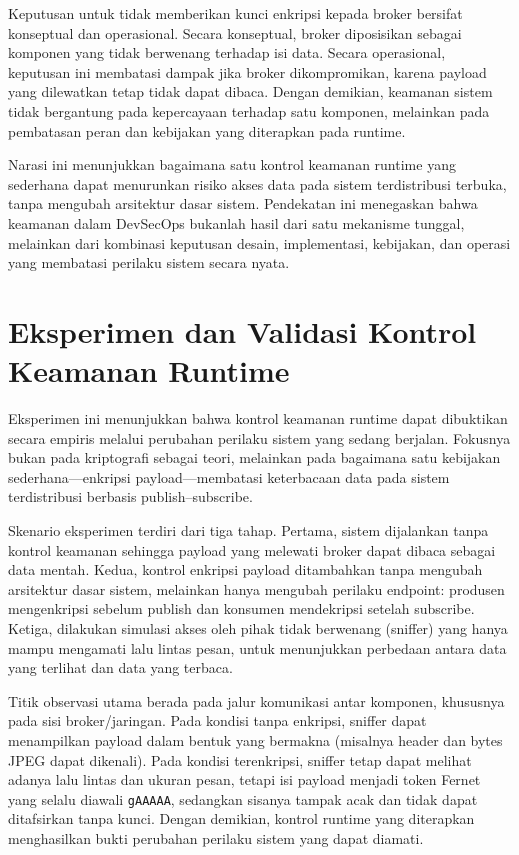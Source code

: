 Keputusan untuk tidak memberikan kunci enkripsi kepada broker bersifat konseptual dan operasional. Secara konseptual, broker diposisikan sebagai komponen yang tidak berwenang terhadap isi data. Secara operasional, keputusan ini membatasi dampak jika broker dikompromikan, karena payload yang dilewatkan tetap tidak dapat dibaca. Dengan demikian, keamanan sistem tidak bergantung pada kepercayaan terhadap satu komponen, melainkan pada pembatasan peran dan kebijakan yang diterapkan pada runtime.

Narasi ini menunjukkan bagaimana satu kontrol keamanan runtime yang sederhana dapat menurunkan risiko akses data pada sistem terdistribusi terbuka, tanpa mengubah arsitektur dasar sistem. Pendekatan ini menegaskan bahwa keamanan dalam DevSecOps bukanlah hasil dari satu mekanisme tunggal, melainkan dari kombinasi keputusan desain, implementasi, kebijakan, dan operasi yang membatasi perilaku sistem secara nyata.


\section{Eksperimen dan Validasi Kontrol Keamanan Runtime}

Eksperimen ini menunjukkan bahwa kontrol keamanan runtime dapat dibuktikan secara empiris melalui perubahan perilaku sistem yang sedang berjalan. Fokusnya bukan pada kriptografi sebagai teori, melainkan pada bagaimana satu kebijakan sederhana---enkripsi payload---membatasi keterbacaan data pada sistem terdistribusi berbasis publish--subscribe.

Skenario eksperimen terdiri dari tiga tahap. Pertama, sistem dijalankan tanpa kontrol keamanan sehingga payload yang melewati broker dapat dibaca sebagai data mentah. Kedua, kontrol enkripsi payload ditambahkan tanpa mengubah arsitektur dasar sistem, melainkan hanya mengubah perilaku endpoint: produsen mengenkripsi sebelum publish dan konsumen mendekripsi setelah subscribe. Ketiga, dilakukan simulasi akses oleh pihak tidak berwenang (sniffer) yang hanya mampu mengamati lalu lintas pesan, untuk menunjukkan perbedaan antara data yang terlihat dan data yang terbaca.

Titik observasi utama berada pada jalur komunikasi antar komponen, khususnya pada sisi broker/jaringan. Pada kondisi tanpa enkripsi, sniffer dapat menampilkan payload dalam bentuk yang bermakna (misalnya header dan bytes JPEG dapat dikenali). Pada kondisi terenkripsi, sniffer tetap dapat melihat adanya lalu lintas dan ukuran pesan, tetapi isi payload menjadi token Fernet yang selalu diawali \texttt{gAAAAA}, sedangkan sisanya tampak acak dan tidak dapat ditafsirkan tanpa kunci. Dengan demikian, kontrol runtime yang diterapkan menghasilkan bukti perubahan perilaku sistem yang dapat diamati.


